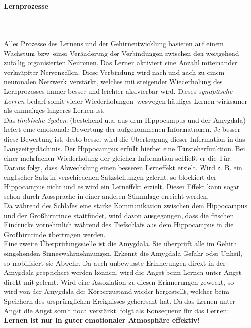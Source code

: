 \paragraph{Lernprozesse}~\\
\\
Alles Prozesse des Lernens und der Gehirnentwicklung basieren auf einem Wachstum bzw. einer Veränderung der Verbindungen zwischen den weitgehend zufällig organisierten Neuronen. Das Lernen aktiviert eine Anzahl miteinander verknüpfter Nervenzellen. Diese Verbindung wird nach und nach zu einem \ql neuronalen Netzwerk\qr\ verstärkt, welches mit steigender Wiederholung des Lernprozesses immer besser und leichter aktivierbar wird. Dieses {\it synaptische Lernen} bedarf somit vieler Wiederholungen, weswegen häufiges Lernen wirksamer als einmaliges längeres Lernen ist.\\
Das {\it limbische System} (bestehend u.a. aus dem Hippocampus und der Amygdala) liefert eine emotionale Bewertung der aufgenommenen Informationen. Je besser diese Bewertung ist, desto besser wird die Übertragung dieser Information in das Langzeitgedächtnis. Der Hippocampus erfüllt hierbei eine Türsteherfunktion. Bei einer mehrfachen Wiederholung der gleichen Information \ql schließt er die Tür\qr . Daraus folgt, dass Abwechslung einen besseren Lerneffekt erzielt. Wird z. B. ein englischer Satz in verschiedenen Satzstellungen gelernt, so blockiert der Hippocampus nicht und es wird ein Lerneffekt erzielt. Dieser Effekt kann sogar schon durch Aussprache in einer anderen Stimmlage erreicht werden.\\
Da während des Schlafes eine starke Kommunikation zwischen dem Hippocampus und der Großhirnrinde stattfindet, wird davon ausgegangen, dass die frischen Eindrücke vornehmlich während des Tiefschlafs aus dem Hippocampus in die Großhirnrinde übertragen werden.\\
Eine zweite Überprüfungsstelle ist die Amygdala. Sie überprüft alle im Gehirn eingehenden Sinneswahrnehmungen. Erkennt die Amygdala Gefahr oder Unheil, so mobilisiert sie Abwehr. Da auch unbewusste Erinnerungen direkt in der Amygdala gespeichert werden können, wird die Angst beim Lernen unter Angst direkt mit gelernt. Wird eine Assoziation zu diesen Erinnerungen geweckt, so wird von der Amygdala der Körperzustand wieder hergestellt, welcher beim Speichern des ursprünglichen Ereignisses geherrscht hat. Da das Lernen unter Angst die Angst somit noch verstärkt, folgt als Konsequenz für das Lernen: {\bf Lernen ist nur in guter emotionaler Atmosphäre effektiv!}\\

